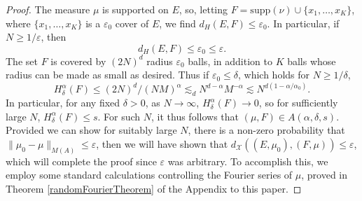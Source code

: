 \documentclass[12pt,reqno]{article}
\numberwithin{equation}{section}
\begin{document}
\begin{proof}
    The measure $\mu$ is supported on $E$, so, letting $F = \text{supp}(\nu) \cup \{ x_1, \dots, x_K \}$, where $\{ x_1, \dots, x_K \}$ is a $\varepsilon_0$ cover of $E$, we find $d_H(E,F) \leq \varepsilon_0$. In particular, if $N \geq 1/\varepsilon$, then
    \begin{equation} \label{equation19230124574}
        d_H(E,F) \leq \varepsilon_0 \leq \varepsilon.
    \end{equation}
    The set $F$ is covered by $(2N)^d$ radius $\varepsilon_0$ balls, in addition to $K$ balls whose radius can be made as small as desired. Thus if $\varepsilon_0 \leq \delta$, which holds for $N \geq 1/\delta$,
    \[ H^\alpha_\delta(F) \leq (2N)^d / (NM)^\alpha \lesssim_d N^{d-\alpha} M^{-\alpha} \lesssim N^{d(1 - \alpha/\alpha_0)}. \]
    In particular, for any fixed $\delta > 0$, as $N \to \infty$, $H^\alpha_\delta(F) \to 0$, so for sufficiently large $N$, $H^\alpha_\delta(F) \leq s$. For such $N$, it thus follows that $(\mu,F) \in A(\alpha,\delta,s)$. Provided we can show for suitably large $N$, there is a non-zero probability that $\| \mu_0 - \mu \|_{M(A)} \leq \varepsilon$, then we will have shown that $d_{\mathcal{X}}((E,\mu_0),(F,\mu)) \leq \varepsilon$, which will complete the proof since $\varepsilon$ was arbitrary. To accomplish this, we employ some standard calculations controlling the Fourier series of $\mu$, proved in Theorem \ref{randomFourierTheorem} of the Appendix to this paper.


\end{proof}
\end{document}

